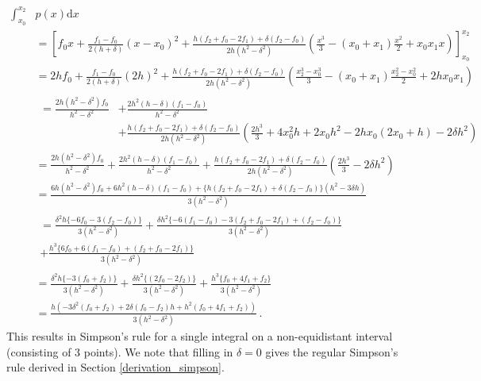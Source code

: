 \begin{align}
    \int_{x_0}^{x_2} &p(x) \mathrm dx \nonumber \\
    &= \left[f_0 x + \frac{f_1-f_0}{2(h+\delta)} (x-x_0)^2 + \frac{h(f_2+f_0-2f_1)+\delta(f_2-f_0)}{2h(h^2-\delta^2)} \left(\frac{x^3}{3}-(x_0+x_1)\frac{x^2}{2} + x_0 x_1 x\right)\right]_{x_0}^{x_2} \nonumber \\
                                     &= 2hf_0 + \frac{f_1-f_0}{2(h+\delta)} (2h)^2 + \frac{h(f_2+f_0-2f_1)+\delta(f_2-f_0)}{2h(h^2-\delta^2)} \left(\frac{x_2^3-x_0^3}{3}-(x_0+x_1)\frac{x_2^2-x_0^2}{2} + 2h x_0 x_1 \right) \nonumber \\
                                     &\begin{aligned}= \frac{2h(h^2-\delta^2)f_0}{h^2-\delta^2} & + \frac{2h^2(h-\delta)(f_1-f_0)}{h^2-\delta^2} \\
                                         & + \frac{h(f_2+f_0-2f_1)+\delta(f_2-f_0)}{2h(h^2-\delta^2)} \left(\frac{2h^3}{3}+4x_0^2h+2x_0h^2-2hx_0(2x_0+h)-2\delta h^2  \right)
                                     \end{aligned} \nonumber \\
                                     &= \frac{2h(h^2-\delta^2)f_0}{h^2-\delta^2} + \frac{2h^2(h-\delta)(f_1-f_0)}{h^2-\delta^2} + \frac{h(f_2+f_0-2f_1)+\delta(f_2-f_0)}{2h(h^2-\delta^2)} \left(\frac{2h^3}{3}-2\delta h^2\right) \nonumber \\
                                     &= \frac{6h(h^2-\delta^2)f_0 + 6h^2(h-\delta)(f_1-f_0) + \{h(f_2+f_0-2f_1)+\delta(f_2-f_0)\} (h^2-3\delta h)}{3(h^2-\delta^2)} \nonumber \\
                                     &\begin{aligned}=\frac{\delta^2 h \{-6f_0 - 3(f_2-f_0)\}}{3(h^2-\delta^2)} + \frac{\delta h^2 \{ -6(f_1-f_0) - 3 (f_2+f_0-2f_1) + (f_2-f_0) \}}{3(h^2-\delta^2)} \\
                                          + \frac{h^3 \{6f_0 + 6(f_1-f_0) + (f_2+f_0-2f_1) \}}{3(h^2-\delta^2)}
                                     \end{aligned} \nonumber \\
                                     &=\frac{\delta^2 h \{-3(f_0+f_2)\}}{3(h^2-\delta^2)} + \frac{\delta h^2 \{ (2f_0-2f_2) \}}{3(h^2-\delta^2)}  + \frac{h^3 \{f_0 + 4f_1 + f_2 \}}{3(h^2-\delta^2)} \nonumber \\
                                     &=\frac{h(-3\delta^2(f_0+f_2) + 2\delta (f_0-f_2)h + h^2 (f_0+4f_1+f_2))}{3 (h^2-\delta^2)} \,. \label{eq:delta_simpson}
\end{align}
This results in Simpson's rule for a single integral on a non-equidistant interval (consisting of 3 points). We note that filling in $\delta = 0$ gives the regular Simpson's rule derived in Section \ref{derivation_simpson}.

